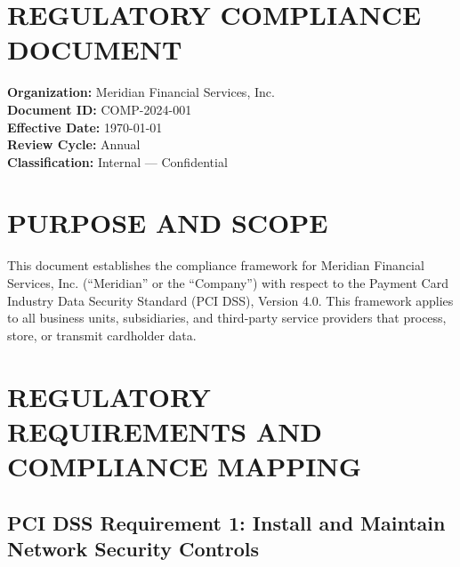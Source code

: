 \documentclass[
    language=english,
    doctype=compliance-document,
    institution=none,
]{../../omnilatex}
\begin{document}
\maketitle

\section*{REGULATORY COMPLIANCE DOCUMENT}

\textbf{Organization:} Meridian Financial Services, Inc.\\
\textbf{Document ID:} COMP-2024-001\\
\textbf{Effective Date:} \today\\
\textbf{Review Cycle:} Annual\\
\textbf{Classification:} Internal --- Confidential

\section{PURPOSE AND SCOPE}

This document establishes the compliance framework for Meridian Financial Services, Inc. (``Meridian'' or the ``Company'') with respect to the Payment Card Industry Data Security Standard (PCI DSS), Version 4.0. This framework applies to all business units, subsidiaries, and third-party service providers that process, store, or transmit cardholder data.

\section{REGULATORY REQUIREMENTS AND COMPLIANCE MAPPING}

\subsection{PCI DSS Requirement 1: Install and Maintain Network Security Controls}
\end{document}
